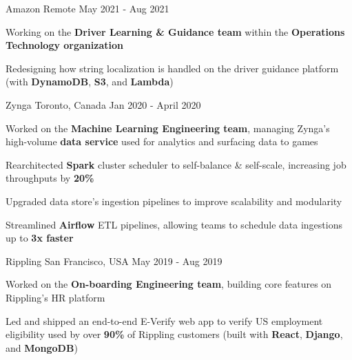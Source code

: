 \documentclass[11pt, a4paper]{awesome-cv}
\begin{document}
\makecvheader





\begin{siderules1}
\begin{cventries}
    \cventry
    {\textit{}}
    {Amazon}
    {Remote}
    {May 2021 - Aug 2021}
    {
      \begin{cvitems}
        \item {Working on the \textbf{Driver Learning \& Guidance team} within the \textbf{Operations Technology organization}}
        \item {Redesigning how string localization is handled on the driver guidance platform (with \textbf{DynamoDB}, \textbf{S3}, and \textbf{Lambda})}
      \end{cvitems}
    }
    \cventry
    {\textit{}}
    {Zynga}
    {Toronto, Canada}
    {Jan 2020 - April 2020}
    {
      \begin{cvitems}
        \item {Worked on the \textbf{Machine Learning Engineering team}, managing Zynga's high-volume \textbf{data service} used for analytics and surfacing data to games}
        \item {Rearchitected \textbf{Spark} cluster scheduler to self-balance \& self-scale, increasing job throughputs by \textbf{20\%}}
        \item {Upgraded data store’s ingestion pipelines to improve scalability and modularity}
        \item {Streamlined \textbf{Airflow} ETL pipelines, allowing teams to schedule data ingestions up to \textbf{3x faster}}
      \end{cvitems}
    }
    \cventry
    {\textit{}}
    {Rippling}
    {San Francisco, USA}
    {May 2019 - Aug 2019}
    {
      \begin{cvitems}
        \item {Worked on the \textbf{On-boarding Engineering team}, building core features on Rippling's HR platform}
        \item {Led and shipped an end-to-end E-Verify web app to verify US employment eligibility used by over \textbf{90\%} of Rippling customers (built with \textbf{React}, \textbf{Django}, and \textbf{MongoDB})}

\end{cvitems}}
\end{cventries}
\end{siderules1}
\end{document}
